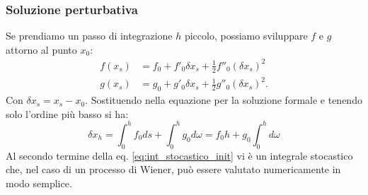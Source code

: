\subsubsection{Soluzione perturbativa}%
\label{subsub:Soluzione perturbativa}
Se prendiamo un passo di integrazione $h$ piccolo, possiamo sviluppare $f$ e $g$ attorno al punto $x_0$:
\[\begin{aligned}
    f(x_s)   &=f_0 + f'_0\delta x_s + \frac{1}{2}f''_0(\delta x_s) ^2 \\
    g(x_s)   &= g_0 + g'_0\delta x_s + \frac{1}{2}g''_0(\delta x_s) ^2 
.\end{aligned}\]
Con $\delta x_s = x_s-x_0$. Sostituendo nella equazione per la soluzione formale e tenendo solo l'ordine più basso si ha:
\begin{equation}
    \delta x_h = \int_{0}^{h} f_0ds + \int_{0}^{h} g_0d\omega  = f_0h + g_0  \int_{0}^{h} d\omega 
    \label{eq:int_stocastico_init}
\end{equation}
Al secondo termine della eq. \ref{eq:int_stocastico_init} vi è un integrale stocastico che, nel caso di un processo di Wiener, può essere valutato numericamente in modo semplice.
